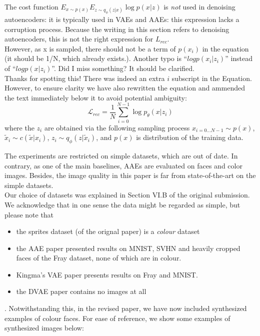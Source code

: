 \documentclass{article}
\begin{document}
The cost function $E_{x\sim p(x)} E_{z\sim q_\phi(z|x)} \log p(x | z)$ is {\em not} used in denoising autoencoders: it is typically used in VAEs and AAEs: this expression lacks a corruption process. Because the writing in this section refers to denoising autoencoders, this is not the right expression for $L_{rec}$.\\

{\color{blue} However, as x is sampled, there should not be a term of $p(x_i)$ in the equation (it should be 1/N, which already exists.). Another typo is “$log p(x_i | z_i)$” instead of “$log p(x | z_i)$”. Did I miss something? It should be clarified.}\\

Thanks for spotting this!  There was indeed an extra $i$ subscript in the Equation. However, to ensure clarity we have also rewritten the equation and ammended the text immediately below it to avoid potential ambiguity:
\[ \mathcal{L}_{rec} = \frac{1}{N}\sum_{i=0}^{N-1} \log p_\theta(x|z_i)\]
where the $z_i$ are obtained via the following sampling process $x_{i=0...N-1} \sim p(x)$, $\tilde{x}_i \sim c(\tilde{x}|x_i)$, $z_i \sim q_\phi(z|\tilde{x}_i)$, and $p(x)$ is distribution of the training data.


{\color{blue}
The experiments are restricted on simple datasets, which are out of date. In contrary, as one of the main baselines, AAEs are evaluated on faces and color images. Besides, the image quality in this paper is far from state-of-the-art on the simple datasets.}\\

Our choice of datasets was explained in Section VI.B of the original submission.  We acknowledge that in one sense the data might be regarded as simple, but please note that 
\begin{itemize}
    \item the sprites dataset (of the orignal paper) is a {\em colour} dataset
    \item the AAE paper \cite{} presented results on MNIST, SVHN and heavily cropped faces of the Fray dataset, none of which are in colour.
    \item Kingma's VAE paper presents results on Fray and MNIST.
    \item the DVAE paper contains no images at all
\end{itemize}. 
Notwithstanding this, in the revised paper, we have now included synthesized examples of colour faces. For ease of reference, we show some examples of synthesized images below:\\
\end{document}
